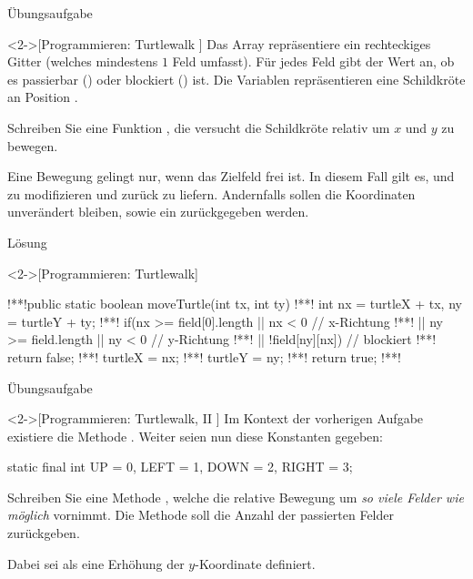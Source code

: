 \begin{frame}[c]{Übungsaufgabe}
    \begin{exercise}<2->[Programmieren: Turtlewalk ]
        \pause{}Das Array  repräsentiere ein rechteckiges Gitter (welches mindestens \(1\) Feld umfasst).\pause{} Für jedes Feld  gibt der Wert an, ob es passierbar () oder blockiert () ist.\pause{} Die Variablen \pause{} repräsentieren eine Schildkröte an Position .\medskip\par
        \pause{}Schreiben Sie eine Funktion , die versucht die Schildkröte relativ um \(x\) und \(y\) zu bewegen.\medskip\par\pause{} Eine Bewegung gelingt nur, wenn das Zielfeld frei ist.\pause{} In diesem Fall gilt es,  und  zu modifizieren und  zurück zu liefern.\pause{} Andernfalls sollen die Koordinaten unverändert bleiben, sowie ein  zurückgegeben werden.
    \end{exercise}
\end{frame}

\begin{frame}[c,fragile]{Lösung}
    \begin{solve}<2->[Programmieren: Turtlewalk]
        \begin{plainjava}
!**!public static boolean moveTurtle(int tx, int ty){
!**!    int nx = turtleX + tx, ny = turtleY + ty;
!**!    if(nx >= field[0].length || nx < 0 // x-Richtung
!**!       || ny >= field.length || ny < 0 // y-Richtung
!**!       || !field[ny][nx]) // blockiert
!**!            return false;
!**!    turtleX = nx;
!**!    turtleY = ny;
!**!    return true;
!**!}
        \end{plainjava}
    \end{solve}
\end{frame}

\begin{frame}[c,fragile]{Übungsaufgabe}
    \begin{exercise}<2->[Programmieren: Turtlewalk, II ]
        \pause{}Im Kontext der vorherigen Aufgabe existiere die Methode .\pause{} Weiter seien nun diese Konstanten gegeben:\pause{}
\begin{plainjava}
static final int UP = 0, LEFT = 1, DOWN = 2, RIGHT = 3;
\end{plainjava}
    \pause{}Schreiben Sie eine Methode , welche die relative Bewegung um \emph{so viele Felder wie möglich} vornimmt.\pause{} Die Methode soll die Anzahl der passierten Felder zurückgeben.\pause{}\medskip\par Dabei sei  als eine Erhöhung der \(y\)-Koordinate definiert.
    \end{exercise}
\end{frame}

